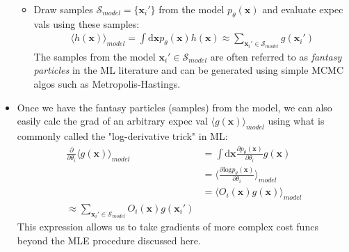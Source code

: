 \documentclass[norsk,a4paper,11pt]{article}
\begin{document}
\begin{itemize}
	\begin{itemize}
		\item Draw samples $\mathcal{S}_{model} = \{ \bm{x}_i' \}$ from the model $p_\theta (\bm{x})$ and evaluate expec vals using these samples:
		\begin{align}
			\langle h(\bm{x}) \rangle_{model} = \int \text{d} \bm{x} p_\theta (\bm{x}) h(\bm{x}) \approx \sum_{\bm{x}_i' \in \mathcal{S}_{model}} g(\bm{x}_i')
		\end{align}
		The samples from the model $\bm{x}_i' \in \mathcal{S}_{model}$ are often referred to as \textit{fantasy particles} in the ML literature and can be generated using simple MCMC algos such as Metropolis-Hastings.
	\end{itemize}
	\item Once we have the fantasy particles (samples) from the model, we can also easily calc the grad of an arbitrary expec val $\langle g(\bm{x}) \rangle_{model}$ using what is commonly called the "log-derivative trick" in ML:
	\begin{align}
		\frac{\partial }{\partial \theta_i} \langle g(\bm{x}) \rangle_{model}
		&= \int \text{d} \bm{x} \frac{\partial p_\theta (\bm{x})}{\partial \theta_i} g(\bm{x}) \\
		&= \langle \frac{\partial \text{log} p_\theta (\bm{x})}{\partial \theta_i} \rangle_{model} \\
		&= \langle O_i (\bm{x}) g(\bm{x}) \rangle_{model} \\
		\approx \sum_{\bm{x}_i' \in \mathcal{S}_{model}} O_i (\bm{x}) g(\bm{x}_i')
	\end{align}
	This expression allows us to take gradients of more complex cost funcs beyond the MLE procedure discussed here.
\end{itemize}
\end{document}
